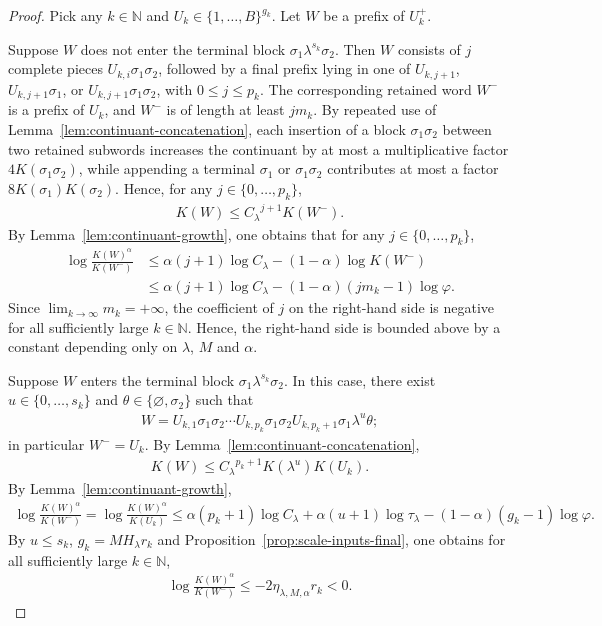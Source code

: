 \documentclass[10pt,a4paper]{amsart}
\begin{document}
\begin{proof}
Pick any $k\in\mathbb{N}$ and $U_k\in\{1,\ldots,B\}^{g_k}$. Let $W$ be a prefix of $U^+_k$.

Suppose $W$ does not enter the terminal block $\sigma_1\lambda^{s_k}\sigma_2$. Then $W$ consists of $j$ complete pieces $U_{k,i}\sigma_1\sigma_2$, followed by a final prefix lying in one of $U_{k,j+1}$, $U_{k,j+1}\sigma_1$, or $U_{k,j+1}\sigma_1\sigma_2$, with $0\leq j\leq p_k$. The corresponding retained word $W^-$ is a prefix of $U_k$, and $W^-$ is of length at least $jm_k$. By repeated use of Lemma~\ref{lem:continuant-concatenation}, each insertion of a block $\sigma_1\sigma_2$ between two retained subwords increases the continuant by at most a multiplicative factor $4K(\sigma_1\sigma_2)$, while appending a
terminal $\sigma_1$ or $\sigma_1\sigma_2$ contributes at most a factor $8K(\sigma_1)K(\sigma_2)$. Hence, for any $j\in\{0,\ldots,p_k\}$,
\begin{align*}
    K(W)\leq {C_\lambda}^{j+1}K(W^-).
\end{align*}
By Lemma~\ref{lem:continuant-growth}, one obtains that for any $j\in\{0,\ldots,p_k\}$,
\begin{align*}
    \log\frac{K(W)^\alpha}{K(W^-)}
    &\leq
    \alpha(j+1)\log C_\lambda
    -(1-\alpha)\log K(W^-) \\
    &\leq
    \alpha(j+1)\log C_\lambda-(1-\alpha)(j m_k-1)\log\varphi.
\end{align*}
Since $\lim_{k\to\infty}m_k=+\infty$, the coefficient of $j$ on the right-hand side is negative for all sufficiently large $k\in\mathbb{N}$. Hence, the right-hand side is bounded above by a constant depending only on $\lambda$, $M$ and $\alpha$.

Suppose $W$ enters the terminal block $\sigma_1\lambda^{s_k}\sigma_2$. In this case, there exist $u\in\{0,\ldots,s_k\}$ and $\theta\in\{\varnothing,\sigma_2\}$ such that
\begin{align*}
    W=
    U_{k,1}\sigma_1\sigma_2\cdots U_{k,p_k}\sigma_1\sigma_2U_{k,p_k+1}\sigma_1\lambda^{u}\theta;
\end{align*}
in particular $W^-=U_k$. By Lemma~\ref{lem:continuant-concatenation},
\begin{align*}
    K(W)\leq {C_\lambda}^{p_k+1}K(\lambda^u)K(U_k).
\end{align*}
By Lemma~\ref{lem:continuant-growth},
\begin{align*}
    \log\frac{K(W)^\alpha}{K(W^-)}
    =
    \log\frac{K(W)^\alpha}{K(U_k)}
    \leq
    \alpha(p_k+1)\log C_\lambda+\alpha(u+1)\log\tau_\lambda-(1-\alpha)(g_k-1)\log\varphi.
\end{align*}
By $u\leq s_k$, $g_k=MH_\lambda r_k$ and Proposition~\ref{prop:scale-inputs-final}, one obtains for all sufficiently large $k\in\mathbb{N}$, 
\begin{align*}
    \log\frac{K(W)^\alpha}{K(W^-)}
    \leq -2\eta_{\lambda,M,\alpha} r_k<0.
\end{align*}
\end{proof}
\end{document}
